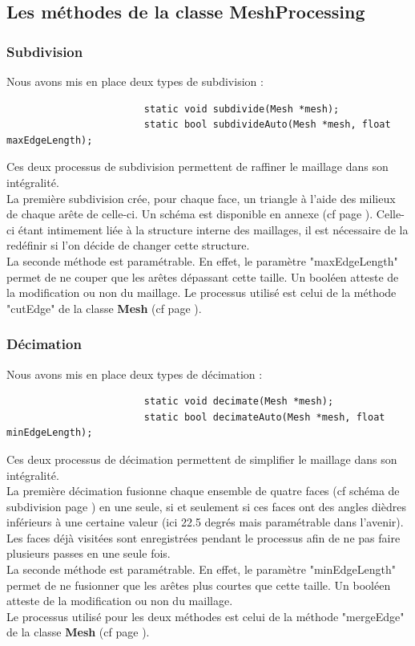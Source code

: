 \documentclass[a4paper]{memoir}
\begin{document}
			\subsection{Les méthodes de la classe MeshProcessing}
				\label{processing-dev}
				\subsubsection{Subdivision}
					Nous avons mis en place deux types de subdivision :
					\begin{verbatim}
						static void subdivide(Mesh *mesh);
						static bool subdivideAuto(Mesh *mesh, float maxEdgeLength);
					\end{verbatim}
					Ces deux processus de subdivision permettent de raffiner le maillage dans son intégralité.\\
					La première subdivision crée, pour chaque face, un triangle à l'aide des milieux de chaque arête de celle-ci. Un schéma est disponible en 
					annexe (cf page \pageref{fig:subdivide}). Celle-ci étant intimement liée à la structure interne des maillages, il est nécessaire de la 
					redéfinir si l'on décide de changer cette structure.\\
					La seconde méthode est paramétrable. En effet, le paramètre "maxEdgeLength" permet de ne couper que les arêtes dépassant cette taille. 
					Un booléen atteste de la modification ou non du maillage. Le processus utilisé est celui de la méthode "cutEdge" de la classe 
					\textbf{Mesh} (cf page \pageref{mesh-dev}).
					
				\subsubsection{Décimation}
					Nous avons mis en place deux types de décimation :
					\begin{verbatim}
						static void decimate(Mesh *mesh);
						static bool decimateAuto(Mesh *mesh, float minEdgeLength);
					\end{verbatim}
					Ces deux processus de décimation permettent de simplifier le maillage dans son intégralité.\\
					La première décimation fusionne chaque ensemble de quatre faces (cf schéma de subdivision page \pageref{fig:subdivide}) en une seule, si 
					et seulement si ces faces ont des angles dièdres inférieurs à une certaine valeur (ici 22.5 degrés mais paramétrable dans l'avenir). Les 
					faces déjà visitées sont enregistrées pendant le processus afin de ne pas faire plusieurs passes en une seule fois.\\
					La seconde méthode est paramétrable. En effet, le paramètre "minEdgeLength" permet de ne fusionner que les arêtes plus courtes que cette 
					taille. Un booléen atteste de la modification ou non du maillage.\\
					Le processus utilisé pour les deux méthodes est celui de la méthode "mergeEdge" de la classe \textbf{Mesh} (cf page \pageref{mesh-dev}).
				
\end{document}
